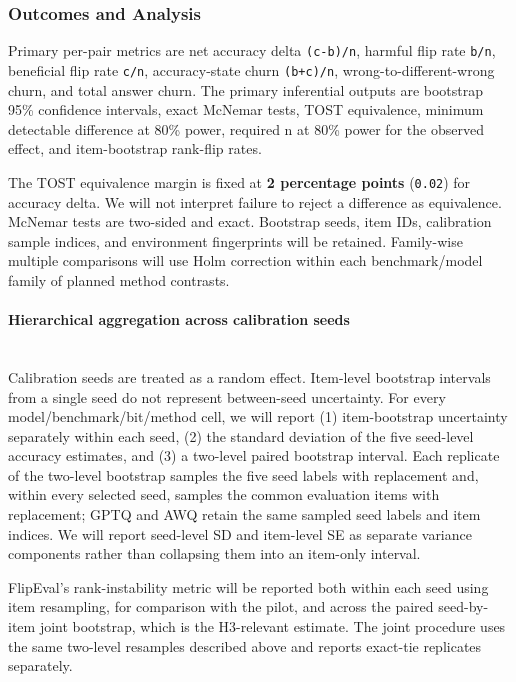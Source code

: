\subsubsection{Outcomes and Analysis}
Primary per-pair metrics are net accuracy delta \texttt{(c-\allowbreak{}b)/\allowbreak{}n}, harmful flip rate \texttt{b/\allowbreak{}n}, beneficial flip rate \texttt{c/\allowbreak{}n}, accuracy-state churn \texttt{(b+c)/\allowbreak{}n}, wrong-to-different-wrong churn, and total answer churn. The primary inferential outputs are bootstrap 95\% confidence intervals, exact McNemar tests, TOST equivalence, minimum detectable difference at 80\% power, required n at 80\% power for the observed effect, and item-bootstrap rank-flip rates.

The TOST equivalence margin is fixed at \textbf{2 percentage points} (\texttt{0.02}) for accuracy delta. We will not interpret failure to reject a difference as equivalence. McNemar tests are two-sided and exact. Bootstrap seeds, item IDs, calibration sample indices, and environment fingerprints will be retained. Family-wise multiple comparisons will use Holm correction within each benchmark/model family of planned method contrasts.

\paragraph{Hierarchical aggregation across calibration seeds}
\mbox{}\\
Calibration seeds are treated as a random effect. Item-level bootstrap intervals from a single seed do not represent between-seed uncertainty. For every model/benchmark/bit/method cell, we will report (1) item-bootstrap uncertainty separately within each seed, (2) the standard deviation of the five seed-level accuracy estimates, and (3) a two-level paired bootstrap interval. Each replicate of the two-level bootstrap samples the five seed labels with replacement and, within every selected seed, samples the common evaluation items with replacement; GPTQ and AWQ retain the same sampled seed labels and item indices. We will report seed-level SD and item-level SE as separate variance components rather than collapsing them into an item-only interval.

FlipEval's rank-instability metric will be reported both within each seed using item resampling, for comparison with the pilot, and across the paired seed-by-item joint bootstrap, which is the H3-relevant estimate. The joint procedure uses the same two-level resamples described above and reports exact-tie replicates separately.

